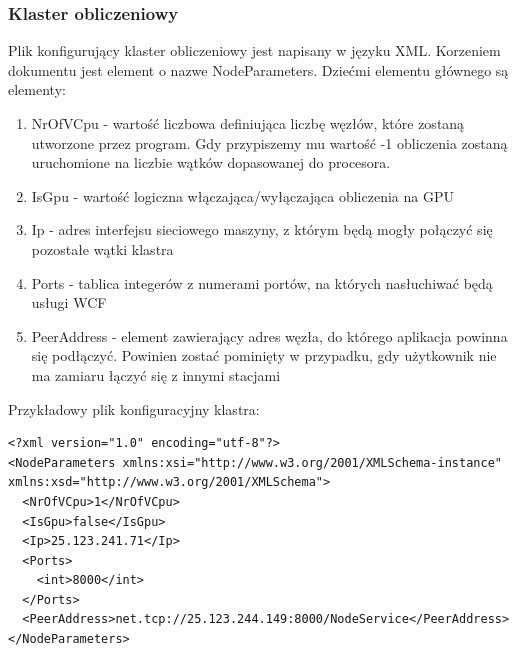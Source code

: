 \documentclass[12pt, twoside, openany, abstract=on]{report}
\theoremstyle{definition}
\begin{document}
\subsubsection{Klaster obliczeniowy}
Plik konfigurujący klaster obliczeniowy jest napisany w języku XML. Korzeniem dokumentu jest element o nazwe NodeParameters. 
Dziećmi elementu głównego są elementy:
\begin{enumerate}
	\item NrOfVCpu - wartość liczbowa definiująca liczbę węzłów, które zostaną utworzone przez program. Gdy przypiszemy mu wartość -1 obliczenia zostaną uruchomione na liczbie wątków dopasowanej do procesora.
	\item IsGpu - wartość logiczna włączająca/wyłączająca obliczenia na GPU
	\item Ip - adres interfejsu sieciowego maszyny, z którym będą mogły połączyć się pozostałe wątki klastra
	\item Ports - tablica integerów z numerami portów, na których nasłuchiwać będą usługi WCF
	\item PeerAddress - element zawierający adres węzła, do którego aplikacja powinna się podłączyć. Powinien zostać pominięty w przypadku, gdy użytkownik nie ma zamiaru łączyć się z innymi stacjami
\end{enumerate}
Przykładowy plik konfiguracyjny klastra:
\lstset{language=XML}
\begin{lstlisting}[frame=single]
<?xml version="1.0" encoding="utf-8"?>
<NodeParameters xmlns:xsi="http://www.w3.org/2001/XMLSchema-instance" xmlns:xsd="http://www.w3.org/2001/XMLSchema">
  <NrOfVCpu>1</NrOfVCpu>
  <IsGpu>false</IsGpu>
  <Ip>25.123.241.71</Ip>
  <Ports>
    <int>8000</int>
  </Ports>
  <PeerAddress>net.tcp://25.123.244.149:8000/NodeService</PeerAddress>
</NodeParameters>
\end{lstlisting}
\end{document}
